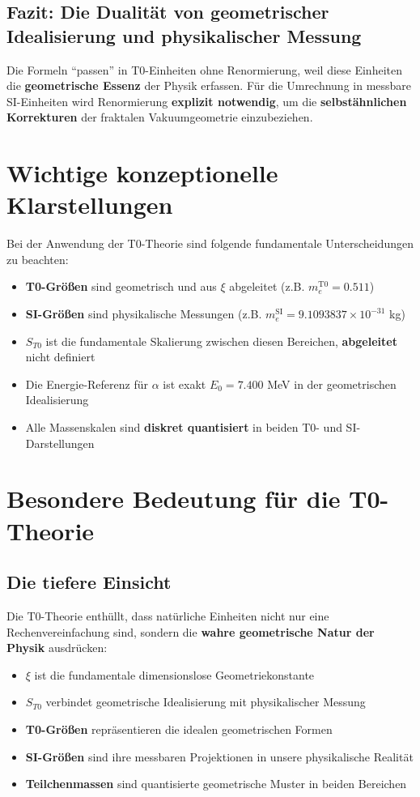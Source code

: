 	\subsection{Fazit: Die Dualität von geometrischer Idealisierung und physikalischer Messung}
	
	Die Formeln ``passen'' in T0-Einheiten ohne Renormierung, weil diese Einheiten die \textbf{geometrische Essenz} der Physik erfassen. Für die Umrechnung in messbare SI-Einheiten wird Renormierung \textbf{explizit notwendig}, um die \textbf{selbstähnlichen Korrekturen} der fraktalen Vakuumgeometrie einzubeziehen.
	
	\section{Wichtige konzeptionelle Klarstellungen}
	
	Bei der Anwendung der T0-Theorie sind folgende fundamentale Unterscheidungen zu beachten:
	
	\begin{itemize}
		\item \textbf{T0-Größen} sind geometrisch und aus $\xi$ abgeleitet (z.B. $m_e^{\mathrm{T0}} = 0.511$)
		\item \textbf{SI-Größen} sind physikalische Messungen (z.B. $m_e^{\mathrm{SI}} = 9.1093837\times 10^{-31}$ kg)
		\item \textbf{$S_{T0}$} ist die fundamentale Skalierung zwischen diesen Bereichen, \textbf{abgeleitet} nicht definiert
		\item Die Energie-Referenz für $\alpha$ ist exakt $E_0 = 7.400$ MeV in der geometrischen Idealisierung
		\item Alle Massenskalen sind \textbf{diskret quantisiert} in beiden T0- und SI-Darstellungen
	\end{itemize}
	
	\section{Besondere Bedeutung für die T0-Theorie}
	
	\subsection{Die tiefere Einsicht}
	Die T0-Theorie enthüllt, dass natürliche Einheiten nicht nur eine Rechenvereinfachung sind, sondern die \textbf{wahre geometrische Natur der Physik} ausdrücken:
	\begin{itemize}
		\item \textbf{$\xi$} ist die fundamentale dimensionslose Geometriekonstante
		\item \textbf{$S_{T0}$} verbindet geometrische Idealisierung mit physikalischer Messung
		\item \textbf{T0-Größen} repräsentieren die idealen geometrischen Formen
		\item \textbf{SI-Größen} sind ihre messbaren Projektionen in unsere physikalische Realität
		\item \textbf{Teilchenmassen} sind quantisierte geometrische Muster in beiden Bereichen
	\end{itemize}
	
